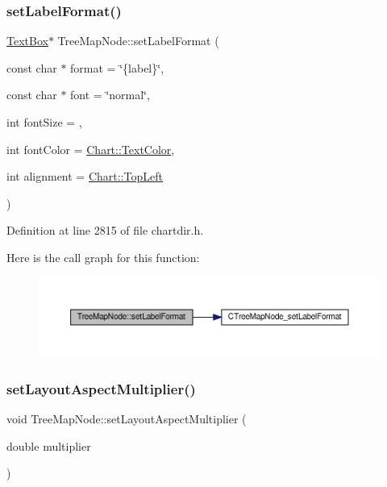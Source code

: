 \subsubsection{\texorpdfstring{set\+Label\+Format()}{setLabelFormat()}}
{\footnotesize\ttfamily \hyperlink{class_text_box}{Text\+Box}$\ast$ Tree\+Map\+Node\+::set\+Label\+Format (\begin{DoxyParamCaption}\item[{const char $\ast$}]{format = {\ttfamily \char`\"{}\{label\}\char`\"{}},  }\item[{const char $\ast$}]{font = {\ttfamily \char`\"{}normal\char`\"{}},  }\item[{int}]{font\+Size = {},  }\item[{int}]{font\+Color = {\ttfamily \hyperlink{namespace_chart_abee0d882fdc9ad0b001245ad9fc64011a879e14f2f5024caccc047374342321ef}{Chart\+::\+Text\+Color}},  }\item[{int}]{alignment = {\ttfamily \hyperlink{namespace_chart_ae222e51ce11a254450b6ddfbc862680aa0bf92d1d2d6713aa62e92b86b9a8532f}{Chart\+::\+Top\+Left}} }\end{DoxyParamCaption})\hspace{0.3cm}{\ttfamily [inline]}}



Definition at line 2815 of file chartdir.\+h.

Here is the call graph for this function\+:
\nopagebreak
\begin{figure}[H]
\begin{center}
\leavevmode
\includegraphics[width=350pt]{class_tree_map_node_ae8ca68707b6ed67384a109d8058a2c97_cgraph}
\end{center}
\end{figure}
\mbox{\label{class_tree_map_node_a7722b40c9891945d11110f2a9122c029}} 
\subsubsection{\texorpdfstring{set\+Layout\+Aspect\+Multiplier()}{setLayoutAspectMultiplier()}}
{\footnotesize\ttfamily void Tree\+Map\+Node\+::set\+Layout\+Aspect\+Multiplier (\begin{DoxyParamCaption}\item[{double}]{multiplier }\end{DoxyParamCaption})\hspace{0.3cm}{\ttfamily [inline]}}



